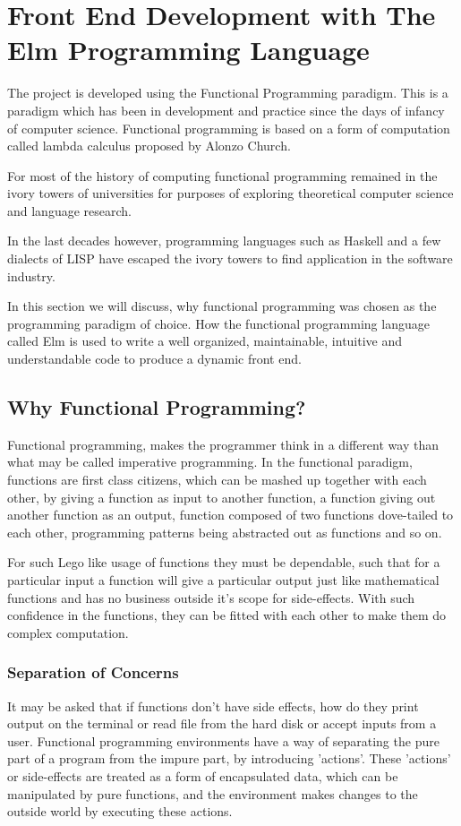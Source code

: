 
\section{Front End Development with The Elm Programming Language}

The project is developed using the Functional Programming paradigm. This is a
paradigm which has been in development and practice since the days of infancy of
computer science. Functional programming is based on a form of computation
called lambda calculus proposed by Alonzo Church.

For most of the history of computing functional programming remained in the
ivory towers of universities for purposes of exploring theoretical computer
science and language research.

In the last decades however, programming languages such as Haskell and a few
dialects of LISP have escaped the ivory towers to find application in the
software industry.

In this section we will discuss, why functional programming was chosen as the
programming paradigm of choice. How the functional programming language called
Elm is used to write a well organized, maintainable, intuitive and
understandable code to produce a dynamic front end.

\subsection{Why Functional Programming?}
Functional programming, makes the programmer think in a different way than what
may be called imperative programming. In the functional paradigm, functions are
first class citizens, which can be mashed up together with each other, by
giving a function as input to another function, a function giving out another
function as an output, function composed of two functions dove-tailed to each
other, programming patterns being abstracted out as functions and so on.

For such Lego like usage of functions they must be dependable, such that for a
particular input a function will give a particular output just like
mathematical functions and has no business outside it's scope for side-effects.
With such confidence in the functions, they can be fitted with each other to
make them do complex computation.

\subsubsection{Separation of Concerns}
It may be asked that if functions don't have side effects, how do they print
output on the terminal or read file from the hard disk or accept inputs from a
user. Functional programming environments have a way of separating the pure
part of a program from the impure part, by introducing 'actions'. These
'actions' or side-effects are treated as a form of encapsulated data, which
can be manipulated by pure functions, and the environment makes changes to the
outside world by executing these actions.

